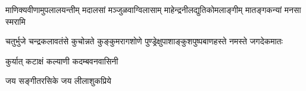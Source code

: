 
\begin{center}
\begin{Large}
\fourlineindentedshloka
{माणिक्यवीणामुपलालयन्तीम्}
{मदालसां मञ्जुळवाग्विलासाम्}
{माहेन्द्रनीलद्युतिकोमलाङ्गीम्}
{मातङ्गकन्यां मनसा स्मरामि}

\twolineshloka
{चतुर्भुजे चन्द्रकलावतंसे कुचोन्नते कुङ्कुमरागशोणे}
{पुण्ड्रेक्षुपाशाङ्कुशपुष्पबाणहस्ते नमस्ते जगदेकमातः}

{कुर्यात् कटाक्षं कल्याणी कदम्बवनवासिनी}

{जय सङ्गीतरसिके जय लीलाशुकप्रिये}
\end{Large}
\end{center}

